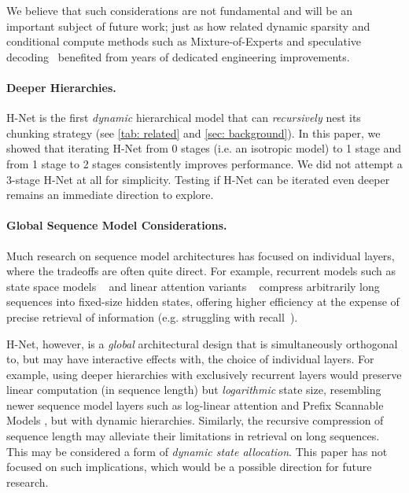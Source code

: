 We believe that such considerations are not fundamental and will be an important subject of future work;
just as how related dynamic sparsity and conditional compute methods such as Mixture-of-Experts and speculative decoding~\citep{SpeculativeDecoding, SpeculativeSampling} benefited from years of dedicated engineering improvements.



\paragraph{Deeper Hierarchies.}
H-Net is the first \emph{dynamic} hierarchical model that can \emph{recursively} nest its chunking strategy (see \cref{tab: related} and \cref{sec: background}).
In this paper, we showed that iterating H-Net from 0 stages (i.e. an isotropic model) to 1 stage and from 1 stage to 2 stages  consistently improves performance.
We did not attempt a 3-stage H-Net at all for simplicity. Testing if H-Net can be iterated even deeper remains an immediate direction to explore. 



\paragraph{Global Sequence Model Considerations.}
Much research on sequence model architectures has focused on individual layers, where the tradeoffs are often quite direct.
For example, recurrent models such as state space models ~\citep{gu2023thesis, Mamba} and linear attention variants ~\citep{LA, GLA, DeltaNet, GatedDeltaNet} compress arbitrarily long sequences into fixed-size hidden states, offering higher efficiency at the expense of precise retrieval of information (e.g. struggling with recall~\citep{RepeatAfterMe}).

H-Net, however, is a \emph{global} architectural design that is simultaneously orthogonal to, but may have interactive effects with, the choice of individual layers.
For example, using deeper hierarchies with exclusively recurrent layers would preserve linear computation (in sequence length) but \emph{logarithmic} state size, resembling newer sequence model layers such as log-linear attention \citep{LogLinearAttn} and Prefix Scannable Models \citep{PrefixScannableModels}, but with dynamic hierarchies.
Similarly, the recursive compression of sequence length may alleviate their limitations in retrieval on long sequences.
This may be considered a form of \emph{dynamic state allocation}.
This paper has not focused on such implications, which would be a possible direction for future research.


